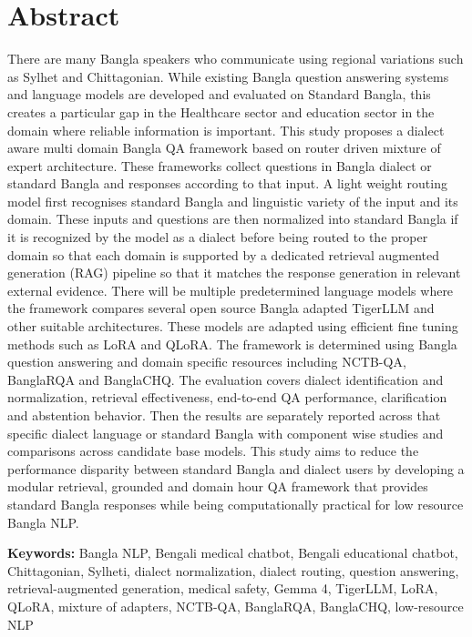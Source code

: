 \section*{Abstract}
There are many Bangla speakers who communicate using regional variations such as Sylhet and Chittagonian. While existing Bangla question answering systems and language models are developed and evaluated on Standard Bangla, this creates a particular gap in the Healthcare sector and education sector in the domain where reliable information is important. This study proposes a dialect aware multi domain Bangla QA framework based on router driven mixture of expert architecture. These frameworks collect questions in Bangla dialect or standard Bangla and responses according to that input. A light weight routing model first recognises standard Bangla and linguistic variety of the input and its domain. These inputs and questions are then normalized into standard Bangla if it is recognized by the model as a dialect before being routed to the proper domain so that each domain is supported by a dedicated retrieval augmented generation (RAG) pipeline so that it matches the response generation in relevant external evidence. There will be multiple predetermined language models where the framework compares several open source Bangla adapted TigerLLM and other suitable architectures. These models are adapted using efficient fine tuning methods such as LoRA and QLoRA. The framework is determined using Bangla question answering and domain specific resources including NCTB-QA, BanglaRQA and BanglaCHQ. The evaluation covers dialect identification and normalization, retrieval effectiveness, end-to-end QA performance, clarification and abstention behavior. Then the results are separately reported across that specific dialect language or standard Bangla with component wise studies and comparisons across candidate base models. This study aims to reduce the performance disparity between standard Bangla and dialect users by developing a modular retrieval, grounded and domain hour QA framework that provides standard Bangla responses while being computationally practical for low resource Bangla NLP.

\vspace{0.5cm}
\textbf{Keywords:} Bangla NLP, Bengali medical chatbot, Bengali educational chatbot, Chittagonian, Sylheti, dialect normalization, dialect routing, question answering, retrieval-augmented generation, medical safety, Gemma 4, TigerLLM, LoRA, QLoRA, mixture of adapters, NCTB-QA, BanglaRQA, BanglaCHQ, low-resource NLP
\clearpage
